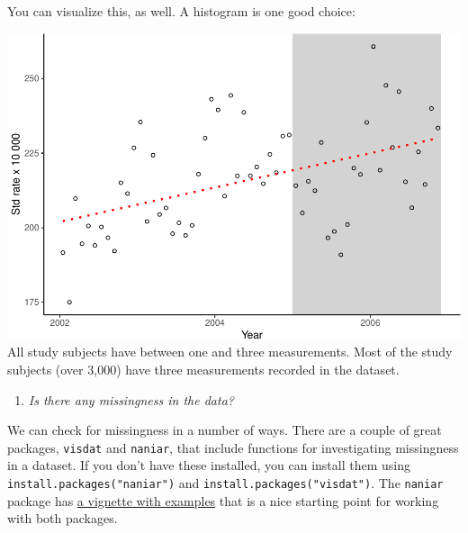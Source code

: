 \documentclass[
]{book}
\newenvironment{Shaded}{\begin{snugshade}}{\end{snugshade}}
\newcommand{\CommentTok}[1]{\textcolor[rgb]{0.56,0.35,0.01}{\textit{#1}}}
\newcommand{\DataTypeTok}[1]{\textcolor[rgb]{0.13,0.29,0.53}{#1}}
\newcommand{\KeywordTok}[1]{\textcolor[rgb]{0.13,0.29,0.53}{\textbf{#1}}}
\newcommand{\NormalTok}[1]{#1}
\newcommand{\OperatorTok}[1]{\textcolor[rgb]{0.81,0.36,0.00}{\textbf{#1}}}
\newcommand{\StringTok}[1]{\textcolor[rgb]{0.31,0.60,0.02}{#1}}
\providecommand{\tightlist}{%
  \setlength{\itemsep}{0pt}\setlength{\parskip}{0pt}}
\begin{document}
You can visualize this, as well. A histogram is one good choice:

\begin{Shaded}
\end{Shaded}

\includegraphics{adv_epi_analysis_files/figure-latex/unnamed-chunk-64-1.pdf}
All study subjects have between one and three measurements. Most of the study
subjects (over 3,000) have three measurements recorded in the dataset.

\begin{enumerate}
\def\labelenumi{\arabic{enumi}.}
\setcounter{enumi}{1}
\tightlist
\item
  \emph{Is there any missingness in the data?}
\end{enumerate}

We can check for missingness in a number of ways. There are a couple of great
packages, \texttt{visdat} and \texttt{naniar}, that include functions for investigating
missingness in a dataset. If you don't have these installed, you can install
them using \texttt{install.packages("naniar")} and \texttt{install.packages("visdat")}. The
\texttt{naniar} package has \href{https://cran.r-project.org/web/packages/naniar/vignettes/getting-started-w-naniar.html}{a vignette with
examples}
that is a nice starting point for working with both packages.
\end{document}
